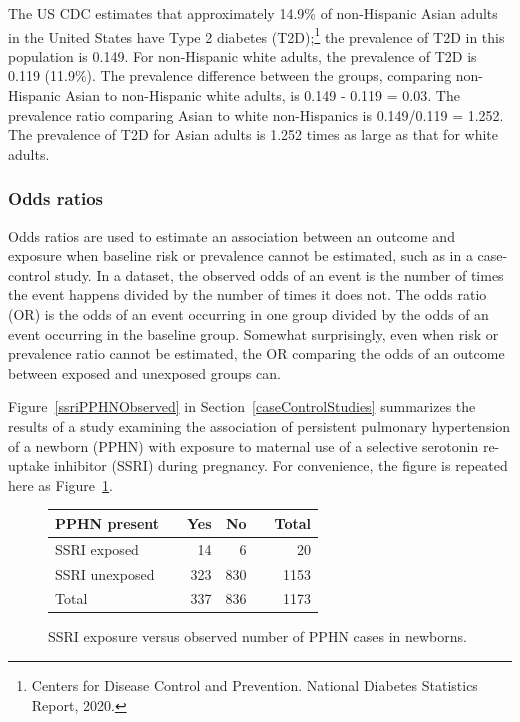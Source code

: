 The US CDC estimates that approximately 14.9\% of non-Hispanic Asian adults in the United States have Type 2 diabetes (T2D);\footnote{Centers for Disease Control and Prevention. National Diabetes Statistics Report, 2020.}  the prevalence of T2D in this population is 0.149.  For non-Hispanic white adults, the prevalence of T2D is 0.119 (11.9\%). The prevalence difference between the groups, comparing non-Hispanic Asian to non-Hispanic white adults, is 0.149 - 0.119 = 0.03.  The prevalence ratio comparing Asian to white non-Hispanics is 0.149/0.119 = 1.252.  The prevalence of T2D for Asian adults is 1.252 times as large as that for white adults.

\subsubsection{Odds ratios}

Odds ratios are used to estimate an association between an outcome and exposure when baseline risk or prevalence cannot be estimated, such as in a case-control study. In a dataset, the observed odds of an event is the number of times the event happens divided by the number of times it does not.  The odds ratio (OR) is the odds of an event occurring in one group divided by the odds of an event occurring in the baseline group.  Somewhat surprisingly, even when risk or prevalence ratio cannot be estimated, the OR comparing the odds of an outcome between exposed and unexposed groups can.

Figure~\ref{ssriPPHNObserved} in Section~\ref{caseControlStudies} summarizes the results of a study examining the association of persistent pulmonary hypertension of a newborn (PPHN) with exposure to maternal use of a selective serotonin re-uptake inhibitor (SSRI) during pregnancy. For convenience, the figure is repeated here as Figure~\ref{ssriPPHNObservedRepeated}.

\begin{figure}[h]
	\centering
	\begin{tabular}{ll rrr r}
		\hline
		PPHN present	 & \hspace{2mm} & Yes & No & \hspace{2mm} & Total \\
		\hline
		SSRI exposed &	& 14 & 6 &  & 20  \\
		SSRI unexposed & & 323 & 830 &  & 1153  \\
        Total & & 337 & 836 & & 1173 \\
		\hline
	\end{tabular}
	\caption{SSRI exposure versus observed number of PPHN cases in newborns.}
    \label{ssriPPHNObservedRepeated}
\end{figure}

